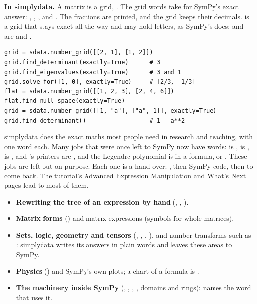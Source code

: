 \textbf{In simplydata.} A matrix is a grid, . The grid words
take  for SymPy's exact answer: , ,
,  and . The fractions are printed, and
the grid keeps their decimals.  is a grid that stays exact all the
way and may hold letters, as SymPy's  does;  and
 are  and .

\begin{lstlisting}[style=py]
grid = sdata.number_grid([[2, 1], [1, 2]])
grid.find_determinant(exactly=True)      # 3
grid.find_eigenvalues(exactly=True)      # 3 and 1
grid.solve_for([1, 0], exactly=True)     # [2/3, -1/3]
flat = sdata.number_grid([[1, 2, 3], [2, 4, 6]])
flat.find_null_space(exactly=True)
grid = sdata.number_grid([[1, "a"], ["a", 1]], exactly=True)
grid.find_determinant()                  # 1 - a**2
\end{lstlisting}


simplydata does the exact maths most people need in research and teaching, with one word each. Many jobs
that were once left to SymPy now have words:  is ,
 is ,  is
,  and 's printers are ,
and the Legendre polynomial is  in a formula, or . These jobs are left out on purpose. Each one is a hand-over: , then
SymPy code, then  to come back. The tutorial's
\href{https://docs.sympy.org/latest/tutorials/intro-tutorial/manipulation.html}{Advanced Expression
Manipulation} and \href{https://docs.sympy.org/latest/tutorials/intro-tutorial/next.html}{What's
Next} pages lead to most of them.
\begin{itemize}
  \item \textbf{Rewriting the tree of an expression by hand} (, , ).
  \item \textbf{Matrix forms} () and matrix expressions (symbols for whole matrices).
  \item \textbf{Sets, logic, geometry and tensors} (, ,
    , ), and number transforms such as : simplydata writes its
    answers in plain words and leaves these areas to SymPy.
  \item \textbf{Physics} () and SymPy's own plots; a chart of a formula is
    .
  \item \textbf{The machinery inside SymPy} (, , , , domains and
    rings):  names the word that uses it.
\end{itemize}


